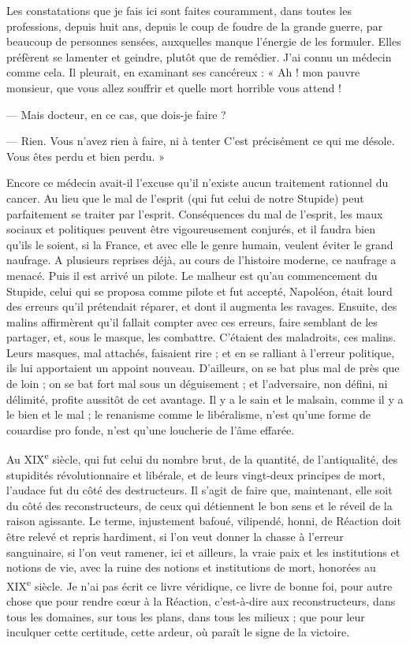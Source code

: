 \documentclass[french,twoside]{book} %
\newcommand\chapterclose{} %
\renewcommand\chapterclose{} %
\begin{document}
Les constatations que je fais ici sont faites couramment, dans toutes les professions, depuis huit ans, depuis le coup de foudre de la grande guerre, par beaucoup de personnes sensées, auxquelles manque l’énergie de les formuler. Elles préfèrent se lamenter et geindre, plutôt que de remédier. J’ai connu un médecin comme cela. Il pleurait, en examinant ses cancéreux : « Ah ! mon pauvre monsieur, que vous allez souffrir et quelle mort horrible vous attend !\par
— Mais docteur, en ce cas, que dois-je faire ?\par
— Rien. Vous n’avez rien à faire, ni à tenter C’est précisément ce qui me désole. Vous êtes perdu et bien perdu. »\par
Encore ce médecin avait-il l’excuse qu’il n’existe aucun traitement rationnel du cancer. Au lieu que le mal de l’esprit (qui fut celui de notre Stupide) peut parfaitement se traiter par l’esprit. Conséquences du mal de l’esprit, les maux sociaux et politiques peuvent être vigoureusement conjurés, et il faudra bien qu’ils le soient, si la France, et avec elle le genre humain, veulent éviter le grand naufrage. A plusieurs reprises déjà, au cours de l’histoire moderne, ce naufrage a menacé. Puis il est arrivé un pilote. Le malheur est qu’au commencement du Stupide, celui qui se proposa comme pilote et fut accepté, Napoléon, était lourd des erreurs qu’il prétendait réparer, et dont il augmenta les ravages. Ensuite, des malins affirmèrent qu’il fallait compter avec ces erreurs, faire semblant de les partager, et, sous le masque, les combattre. C’étaient des maladroits, ces malins. Leurs masques, mal attachés, faisaient rire ; et en se ralliant à l’erreur politique, ils lui apportaient un appoint nouveau. D’ailleurs, on se bat plus mal de près que de loin ; on se bat fort mal sous un déguisement ; et l’adversaire, non défini, ni délimité, profite aussitôt de cet avantage. Il y a le sain et le malsain, comme il y a le bien et le mal ; le renanisme comme le libéralisme, n’est qu’une forme de couardise pro fonde, n’est qu’une loucherie de l’âme effarée.\par
Au XIX\textsuperscript{e} siècle, qui fut celui du nombre brut, de la quantité, de l’antiqualité, des stupidités révolutionnaire et libérale, et de leurs vingt-deux principes de mort, l’audace fut du côté des destructeurs. Il s’agit de faire que, maintenant, elle soit du côté des reconstructeurs, de ceux qui détiennent le bon sens et le réveil de la raison agissante. Le terme, injustement bafoué, vilipendé, honni, de Réaction doit être relevé et repris hardiment, si l’on veut donner la chasse à l’erreur sanguinaire, si l’on veut ramener, ici et ailleurs, la vraie paix et les institutions et notions de vie, avec la ruine des notions et institutions de mort, honorées au XIX\textsuperscript{e} siècle. Je n’ai pas écrit ce livre véridique, ce livre de bonne foi, pour autre chose que pour rendre cœur à la Réaction, c’est-à-dire aux reconstructeurs, dans tous les domaines, sur tous les plans, dans tous les milieux ; que pour leur inculquer cette certitude, cette ardeur, où paraît le signe de la victoire.
\chapterclose
\end{document}
